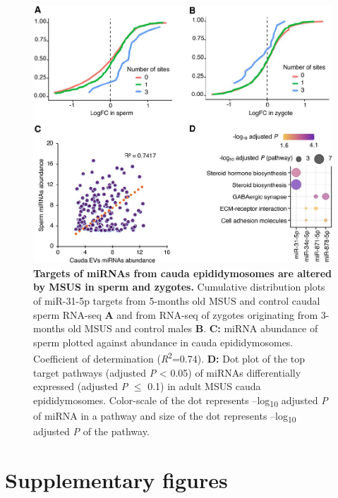 \documentclass[12pt,twoside]{reedthesis}
\begin{document}
\begin{figure}[htbp]

{\centering \includegraphics{thesis_files/figure-latex/ef4-1} 

}

\caption[Targets of miRNAs from cauda epididymosomes are altered by MSUS in sperm and zygotes]{\textbf{Targets of miRNAs from cauda epididymosomes are altered by MSUS in sperm and zygotes.} \newline Cumulative distribution plots of miR-31-5p targets from 5-months old MSUS and control caudal sperm RNA-seq \textbf{A} and from RNA-seq of zygotes originating from 3-months old MSUS and control males \textbf{B}. \newline \textbf{C:} miRNA abundance of sperm plotted against abundance in cauda epididymosomes. Coefficient of determination (\emph{R}\textsuperscript{2}=0.74). \newline \textbf{D:} Dot plot of the top target pathways (adjusted \emph{P} \textless{} 0.05) of miRNAs differentially expressed (adjusted \emph{P} \(\leq\) 0.1) in adult MSUS cauda epididymosomes. Color-scale of the dot represents --log\textsubscript{10} adjusted \emph{P} of miRNA in a pathway and size of the dot represents --log\textsubscript{10} adjusted \emph{P} of the pathway.}\label{fig:ef4}
\end{figure}
\hypertarget{supplementary-figures-1}{%
\section{Supplementary figures}\label{supplementary-figures-1}}
\end{document}
